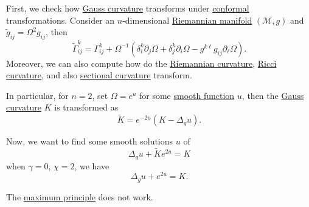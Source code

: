 First, we check how \hyperref[rmk:Gauss-curvature]{Gauss curvature} transforms under \hyperref[def:conformal]{conformal} transformations. Consider an \(n\)-dimensional \hyperref[def:Riemannian-manifold]{Riemannian manifold} \((\mathcal{M} , g)\) and \(\widetilde{g} _{ij} = \Omega ^2 g_{ij}\), then
\[
	\widetilde{\Gamma} ^k_{ij} = \Gamma ^k_{ij} + \Omega ^{-1} (\delta _i^k \partial _j \Omega + \delta _j^k \partial _i \Omega - g^{k \ell } g_{ij} \partial _\ell \Omega ).
\]
Moreover, we can also compute how do the \hyperref[def:Riemannian-curvature]{Riemannian curvature}, \hyperref[def:Ricci-curvature]{Ricci curvature}, and also \hyperref[def:sectional-curvature]{sectional curvature} transform.

In particular, for \(n=2\), set \(\Omega = e^u\) for some \hyperref[def:smooth-function]{smooth function} \(u\), then the \hyperref[rmk:Gauss-curvature]{Gauss curvature} \(K\) is transformed as
\[
	\widetilde{K} = e^{-2u} (K - \Delta _g u).
\]

Now, we want to find some smooth solutions \(u\) of
\[
	\Delta _g u + \widetilde{K} e^{2u} = K
\]
when \(\gamma = 0\), \(\chi = 2\), we have
\[
	\Delta _g u + e^{2u} = K.
\]

\begin{note}
	The \href{https://en.wikipedia.org/wiki/Maximum_principle}{maximum principle} does not work.
\end{note}

